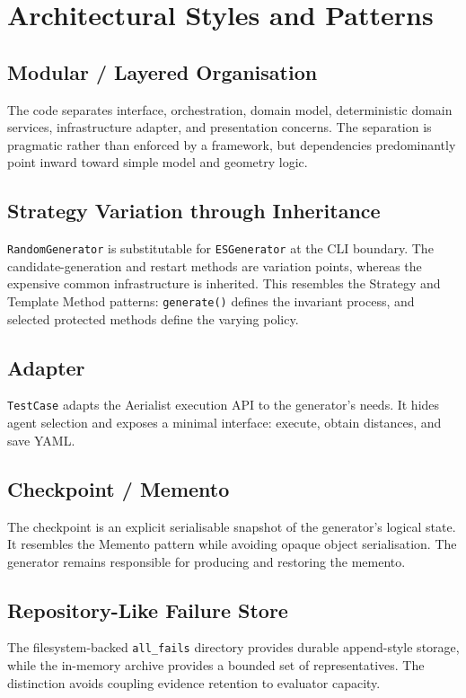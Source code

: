 \documentclass[11pt,a4paper,openany]{report}
\newcommand{\code}[1]{\texttt{#1}}
\begin{document}
\section{Architectural Styles and Patterns}

\subsection{Modular / Layered Organisation}
The code separates interface, orchestration, domain model, deterministic domain services, infrastructure adapter, and presentation concerns. The separation is pragmatic rather than enforced by a framework, but dependencies predominantly point inward toward simple model and geometry logic.

\subsection{Strategy Variation through Inheritance}
\code{RandomGenerator} is substitutable for \code{ESGenerator} at the CLI boundary. The candidate-generation and restart methods are variation points, whereas the expensive common infrastructure is inherited. This resembles the Strategy and Template Method patterns: \code{generate()} defines the invariant process, and selected protected methods define the varying policy.

\subsection{Adapter}
\code{TestCase} adapts the Aerialist execution API to the generator's needs. It hides agent selection and exposes a minimal interface: execute, obtain distances, and save YAML.

\subsection{Checkpoint / Memento}
The checkpoint is an explicit serialisable snapshot of the generator's logical state. It resembles the Memento pattern while avoiding opaque object serialisation. The generator remains responsible for producing and restoring the memento.

\subsection{Repository-Like Failure Store}
The filesystem-backed \code{all\_fails} directory provides durable append-style storage, while the in-memory archive provides a bounded set of representatives. The distinction avoids coupling evidence retention to evaluator capacity.
\end{document}
